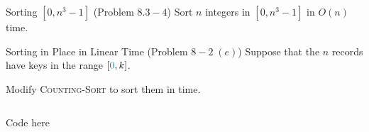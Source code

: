 
\begin{frame}{}
  \begin{exampleblock}{Sorting $[0, n^3-1]$ (Problem $8.3-4$)}
    Sort $n$ integers in $[0, n^3-1]$ in $O(n)$ time.
  \end{exampleblock}
\end{frame}

\begin{frame}{}
  \begin{exampleblock}{Sorting in Place in Linear Time (Problem $8-2\; (e)$)}
    Suppose that the $n$ records have keys in the range $[\textcolor{teal}{0}, k]$.

    Modify \textsc{Counting-Sort} to sort them  in  time.
  \end{exampleblock}

  \begin{columns}
      \pause
      \pause

      \pause
  \end{columns}
\end{frame}

\begin{frame}{}
  \begin{columns}

      \centerline{\texttt{}}
      Code here
  \end{columns}
\end{frame}
